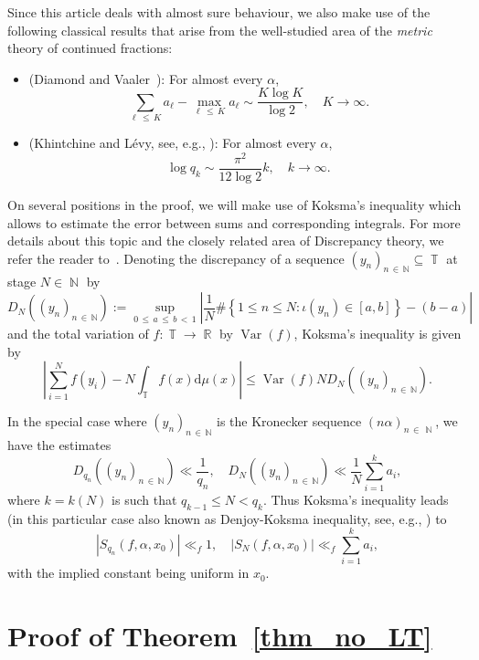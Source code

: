 \documentclass[10pt,a4paper]{amsart}
\numberwithin{equation}{section}
\DeclareMathOperator{\R}{\mathbb{R}}
\DeclareMathOperator{\N}{\mathbb{N}}
\DeclareMathOperator{\T}{\mathbb{T}}
\DeclareMathOperator{\Var}{Var}
\newcommand{\rmd}{\mathrm{d}}
\newcommand{\yn}{(y_n)_{n\,\in\,\mathbb{N}} }
\theoremstyle{definition}
\begin{document}
Since this article deals with almost sure behaviour, we also make use of the following classical results that arise from the well-studied area of the \emph{metric} theory of continued fractions:
\begin{itemize}
\item (Diamond and Vaaler~\cite{diamond_vaaler}): For almost every $\alpha$,
\begin{equation}\label{Eq_trimmed_sum}
\sum_{\ell\,\leq\,K} a_{\ell} - \max\limits_{\ell\,\leq\,K} a_{\ell} \sim \frac{K \log K}{\log 2}, \quad K \to \infty.
\end{equation}
\item (Khintchine and Lévy, see, e.g., \cite[Chapter~5, \S9, Theorem~1]{rock_sz}): For almost every $\alpha$,
\begin{equation}\label{Eq_size_of_q_k}
\log q_k \sim \frac{\pi^2}{12 \log 2} k, \quad k \to \infty.
\end{equation}
\end{itemize}

On several positions in the proof, we will make use of Koksma's inequality which allows to estimate the error between sums and corresponding integrals. For more details about this topic and the closely related area of Discrepancy theory, we refer the reader to~\cite{kuipers}. Denoting the discrepancy of a sequence $\yn \subseteq \T$ at stage $N \in \N$ by
\[
D_N(\yn) := \sup\limits_{0\,\leq\,a\,\leq\,b\,<\,1} \left | \frac{1}{N}\#\left\{1 \leq n \leq N: \iota(y_n) \in [a,b]\right\} - (b-a) \right |
\]
and the total variation of $f: \T \to \R$ by $\Var(f)$, Koksma's inequality is given by
\[
\left| \sum_{i=1}^{N} f(y_i) - N\int_{\T} f(x) \rmd \mu(x) \right| \leq \Var(f)N D_N(\yn).
\]

In the special case where $\yn$ is the Kronecker sequence $(n\alpha)_{n\,\in\,\N}$, we have the estimates
\[
D_{q_n}(\yn) \ll \frac{1}{q_n}, \quad D_{N}(\yn) \ll \frac{1}{N}\sum_{i=1}^{k} a_i,
\]
where $k = k(N)$ is such that $q_{k-1} \leq N < q_{k}$. Thus Koksma's inequality leads (in this particular case also known as Denjoy-Koksma inequality, see, e.g., \cite{herman}) to
\begin{equation}\label{denj_koks}
\left | S_{q_n}(f, \alpha, x_0) \right |
\ll_f 1, \quad
\left | S_{N}(f, \alpha, x_0) \right | \ll_f \sum_{i=1}^{k} a_i,
\end{equation}
with the implied constant being uniform in $x_0$.

\section{Proof of Theorem~\ref{thm_no_LT}}\label{Sect_Pf_noCLT}
\end{document}
